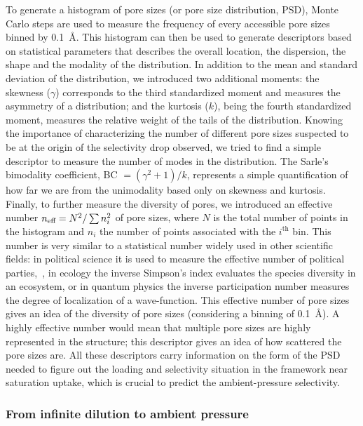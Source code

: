 \documentclass[main]{subfiles}
\begin{document}
To generate a histogram of pore sizes (or pore size distribution, PSD), Monte Carlo steps are used to measure the frequency of every accessible pore sizes binned by \SI{0.1}{\angstrom}.\autocite{poresize_Pinheiro2013} This histogram can then be used to generate descriptors based on statistical parameters that describes the overall location, the dispersion, the shape and the modality of the distribution. In addition to the mean and standard deviation of the distribution, we introduced two additional moments: the skewness ($\gamma$) corresponds to the third standardized moment and measures the asymmetry of a distribution; and the kurtosis ($k$), being the fourth standardized moment, measures the relative weight of the tails of the distribution. Knowing the importance of characterizing the number of different pore sizes suspected to be at the origin of the selectivity drop observed, we tried to find a simple descriptor to measure the number of modes in the distribution. The Sarle's bimodality coefficient, BC $= (\gamma^2 +1)/k$, represents a simple quantification of how far we are from the unimodality based only on skewness and kurtosis.\autocite{Tarba_2022}
Finally, to further measure the diversity of pores, we introduced an effective number $n_{\text{eff}} = N^2/\sum n_i^2$ of pore sizes, where $N$ is the total number of points in the histogram and $n_i$ the number of points associated with the $i^\text{th}$ bin. This number is very similar to a statistical number widely used in other scientific fields: in political science it is used to measure the effective number of political parties,~\autocite{neffposci_Laakso1979}, in ecology the inverse Simpson's index evaluates the species diversity in an ecosystem,\autocite{neffbio_Simpson1949} or in quantum physics the inverse participation number measures the degree of localization of a wave-function.\autocite{neffphys_Kramer1993} This effective number of pore sizes gives an idea of the diversity of pore sizes (considering a binning of \SI{0.1}{\angstrom}). A highly effective number would mean that multiple pore sizes are highly represented in the structure; this descriptor gives an idea of how scattered the pore sizes are.
All these descriptors carry information on the form of the PSD needed to figure out the loading and selectivity situation in the framework near saturation uptake, which is crucial to predict the ambient-pressure selectivity.

\subsubsection{From infinite dilution to ambient pressure}
\end{document}
